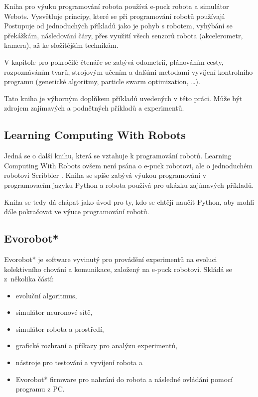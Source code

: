         Kniha pro výuku programování robota používá e-puck robota a simulátor
        Webots. Vysvětluje principy, které se při programování robotů
        používají. Postupuje od jednoduchých příkladů jako je pohyb s robotem,
        vyhýbání se překážkám, následování čáry, přes využití všech senzorů
        robota (akcelerometr, kamera), až ke složitějším technikám.

        V kapitole pro pokročilé čtenáře se zabývá odometrií, plánováním cesty,
        rozpoznáváním tvarů, strojovým učením a dalšími metodami vyvíjení
        kontrolního programu (genetické algoritmy, particle swarm optimization,
        \ldots).

        Tato kniha je výborným doplňkem příkladů uvedených v této práci. Může
        být zdrojem zajímavých a podnětných příkladů a experimentů.

        \subsection{Learning Computing With Robots}
        \label{learning-computing}

        Jedná se o další knihu, která se vztahuje k programování robotů.
        Learning Computing With Robots \cite{learning} ovšem není psána o e-puck
        robotovi, ale o jednoduchém robotovi Scribbler \cite{scribbler}. Kniha se spíše zabývá
        výukou programování v programovacím jazyku Python a robota používá pro
        ukázku zajímavých příkladů.

        Kniha se tedy dá chápat jako úvod pro ty, kdo se chtějí naučit Python,
        aby mohli dále pokračovat ve výuce programování robotů.

        \subsection{Evorobot*}
        \label{evorobot*}

        Evorobot* \cite{evorobot} je software vyvinutý pro provádění
        experimentů na evoluci kolektivního chování a komunikace, založený na
        e-puck robotovi. Skládá se z~několika částí:

        \begin{itemize}
            \item evoluční algoritmus,
            \item simulátor neuronové sítě,
            \item simulátor robota a prostředí,
            \item grafické rozhraní a příkazy pro analýzu experimentů,
            \item nástroje pro testování a vyvíjení robota a
            \item Evorobot* firmware pro nahrání do robota a následné ovládání pomocí programu z PC.
        \end{itemize}

